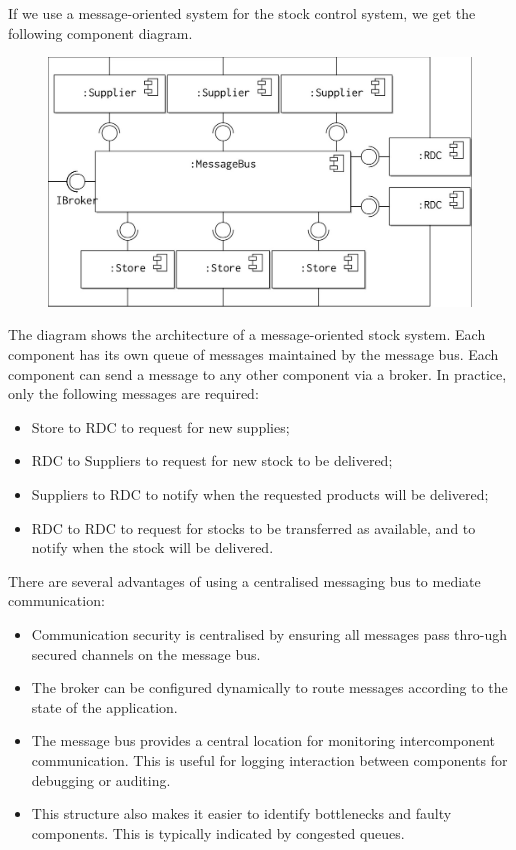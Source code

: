 \documentclass[a4paper, openany]{memoir}
\begin{document}
If we use a message-oriented system for the stock control system, we get the following component diagram.
\begin{figure}[H]
    \centering
    \includegraphics[scale=0.35]{src/14.11 Stock 2.png}
\end{figure}
\noindent The diagram shows the architecture of a message-oriented stock system. Each component has its own queue of messages maintained by the message bus. Each component can send a message to any other component via a broker. In practice, only the following messages are required:
\begin{itemize}
    \item Store to RDC to request for new supplies;
    \item RDC to Suppliers to request for new stock to be delivered;
    \item Suppliers to RDC to notify when the requested products will be delivered;
    \item RDC to RDC to request for stocks to be transferred as available, and to notify when the stock will be delivered.
\end{itemize}

There are several advantages of using a centralised messaging bus to mediate communication:
\begin{itemize}
    \item Communication security is centralised by ensuring all messages pass thro-ugh secured channels on the message bus.
    \item The broker can be configured dynamically to route messages according to the state of the application.
    \item The message bus provides a central location for monitoring intercomponent communication. This is useful for logging interaction between components for debugging or auditing.
    \item This structure also makes it easier to identify bottlenecks and faulty components. This is typically indicated by congested queues.
\end{itemize}
\end{document}
